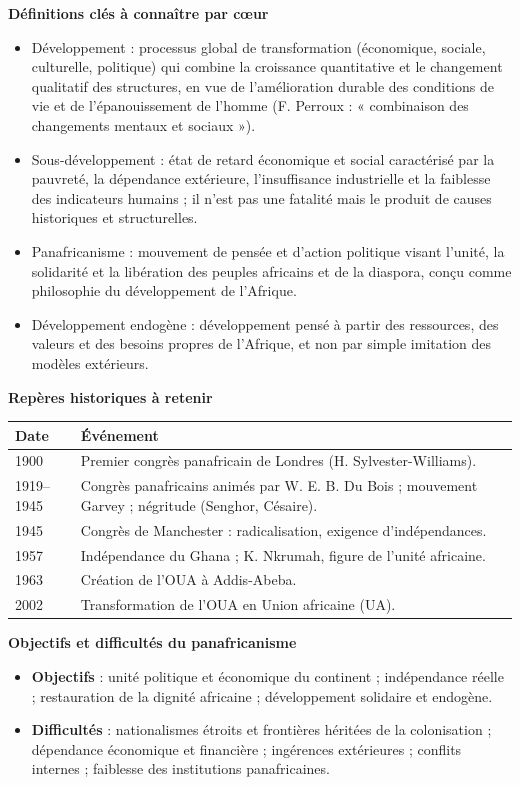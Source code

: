 \documentclass[11pt]{article}
\newcommand{\cle}[1]{{\popxbold\color{popdark}#1}}
\begin{document}
\begin{bilan}
\textbf{Définitions clés à connaître par c\oe ur}
\begin{itemize}
\item \cle{Développement} : processus global de transformation (économique, sociale, culturelle, politique) qui combine la croissance quantitative et le changement qualitatif des structures, en vue de l'amélioration durable des conditions de vie et de l'épanouissement de l'homme (F. Perroux : « combinaison des changements mentaux et sociaux »).
\item \cle{Sous-développement} : état de retard économique et social caractérisé par la pauvreté, la dépendance extérieure, l'insuffisance industrielle et la faiblesse des indicateurs humains ; il n'est pas une fatalité mais le produit de causes historiques et structurelles.
\item \cle{Panafricanisme} : mouvement de pensée et d'action politique visant l'unité, la solidarité et la libération des peuples africains et de la diaspora, conçu comme philosophie du développement de l'Afrique.
\item \cle{Développement endogène} : développement pensé à partir des ressources, des valeurs et des besoins propres de l'Afrique, et non par simple imitation des modèles extérieurs.
\end{itemize}

\textbf{Repères historiques à retenir}
\begin{center}
\begin{tabularx}{\linewidth}{|l|X|}
\hline
\rowcolor{popblueL} \textbf{Date} & \textbf{Événement} \\
\hline
1900 & Premier congrès panafricain de Londres (H. Sylvester-Williams). \\
\hline
1919--1945 & Congrès panafricains animés par W. E. B. Du Bois ; mouvement Garvey ; négritude (Senghor, Césaire). \\
\hline
1945 & Congrès de Manchester : radicalisation, exigence d'indépendances. \\
\hline
1957 & Indépendance du Ghana ; K. Nkrumah, figure de l'unité africaine. \\
\hline
1963 & Création de l'OUA à Addis-Abeba. \\
\hline
2002 & Transformation de l'OUA en Union africaine (UA). \\
\hline
\end{tabularx}
\end{center}

\textbf{Objectifs et difficultés du panafricanisme}
\begin{itemize}
\item \textbf{Objectifs} : unité politique et économique du continent ; indépendance réelle ; restauration de la dignité africaine ; développement solidaire et endogène.
\item \textbf{Difficultés} : nationalismes étroits et frontières héritées de la colonisation ; dépendance économique et financière ; ingérences extérieures ; conflits internes ; faiblesse des institutions panafricaines.
\end{itemize}


\end{bilan}
\end{document}
